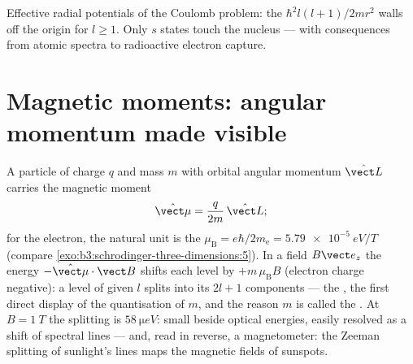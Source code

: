 \begin{omfigure}

{\small Effective radial potentials of the Coulomb problem: the
 $\hbar^2l(l+1)/2mr^2$ walls off the origin for
$l \ge 1$. Only $s$ states touch the nucleus --- with consequences
from atomic spectra to radioactive electron capture.}
\end{omfigure}

\section{Magnetic moments: angular momentum made visible}

\begin{proposition}\label{prop:b3:quantum-angular-momentum:magnetic}
A particle of charge $q$ and mass $m$ with orbital angular momentum
$\hat{\vect L}$ carries the magnetic moment
\[
\hat{\vect\mu} = \frac{q}{2m}\,\hat{\vect L} ;
\]
for the electron, the natural unit is the \emph{}
$\mu_{\text{B}} = e\hbar/2m_{\text{e}} = \qty{5.79e-5}{eV/T}$
(compare \cref{exo:b3:schrodinger-three-dimensions:5}). In a field
$B\vect e_z$ the energy $-\hat{\vect\mu}\cdot\vect B$ shifts each
level by $+m\,\mu_{\text{B}}B$ (electron charge negative): a level
of given $l$ splits into its $2l + 1$ components --- the
\emph{}, the first direct display of the quantisation
of $m$, and the reason $m$ is called the .
At $B = \qty{1}{T}$ the splitting is $\qty{58}{\micro eV}$: small
beside optical energies, easily resolved as a shift of spectral
lines --- and, read in reverse, a magnetometer: the Zeeman splitting
of sunlight's lines maps the magnetic fields of sunspots.
\end{proposition}

